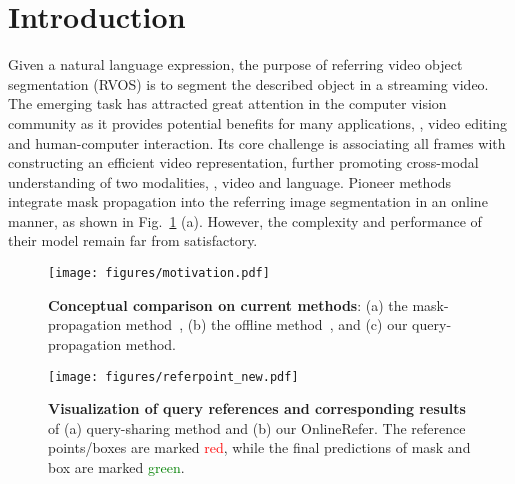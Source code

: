 \documentclass[10pt,twocolumn,letterpaper]{article}
\begin{document}
\section{Introduction}

Given a natural language expression, the purpose of referring video object segmentation (RVOS) is to segment the described object in a streaming video.
The emerging task has attracted great attention in the computer vision community as it provides potential benefits for many applications, \eg, video editing and human-computer interaction. 
Its core challenge is associating all frames with constructing an efficient video representation, further promoting cross-modal understanding of two modalities, \ie, video and language.
Pioneer methods~\cite{khoreva2019video, URVOS} integrate mask propagation into the referring image segmentation in an online manner, as shown in Fig.~\ref{fig:motivation} (a).
However, the complexity and performance of their model remain far from satisfactory.


\begin{figure}
	\texttt{[image: figures/motivation.pdf]}
	\vspace{-20pt}
	\caption{\textbf{Conceptual comparison on current methods}: (a) the  mask-propagation method~\cite{khoreva2019video,URVOS}, (b) the offline method~\cite{hui2021collaborative,mttr,referformer}, and (c) our query-propagation method. }
	\vspace{-4mm}
	\label{fig:motivation}
\end{figure}

\begin{figure*}
\centering
	\texttt{[image: figures/referpoint\_new.pdf]}
	\vspace{-24pt}
	\caption{\textbf{Visualization of query references and corresponding results} of (a) query-sharing method and (b) our OnlineRefer. The reference points/boxes are marked \textcolor{red}{red}, while the final predictions of mask and box are marked \textcolor{green}{green}.}
	\vspace{-4mm}
	\label{fig:referpoint}
\end{figure*}
\end{document}
